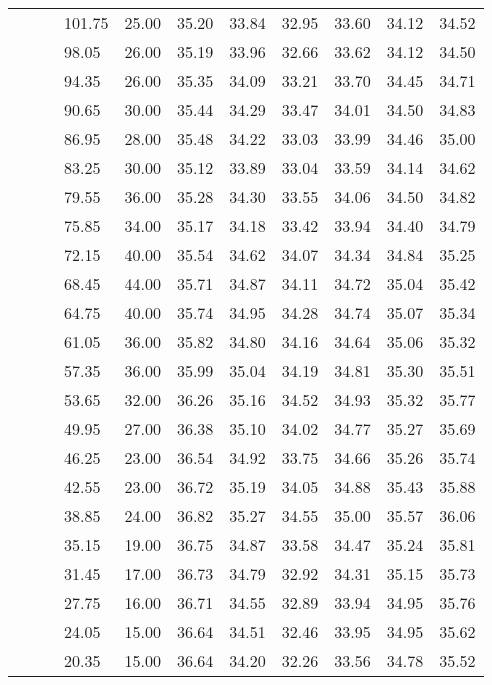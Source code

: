 \begin{longtable}{llllrrrrrrr}
   &  &  & 101.75 & 25.00 & 35.20 & 33.84 & 32.95 & 33.60 & 34.12 & 34.52 \\ 
   &  &  & 98.05 & 26.00 & 35.19 & 33.96 & 32.66 & 33.62 & 34.12 & 34.50 \\ 
   &  &  & 94.35 & 26.00 & 35.35 & 34.09 & 33.21 & 33.70 & 34.45 & 34.71 \\ 
   &  &  & 90.65 & 30.00 & 35.44 & 34.29 & 33.47 & 34.01 & 34.50 & 34.83 \\ 
   &  &  & 86.95 & 28.00 & 35.48 & 34.22 & 33.03 & 33.99 & 34.46 & 35.00 \\ 
   &  &  & 83.25 & 30.00 & 35.12 & 33.89 & 33.04 & 33.59 & 34.14 & 34.62 \\ 
   &  &  & 79.55 & 36.00 & 35.28 & 34.30 & 33.55 & 34.06 & 34.50 & 34.82 \\ 
   &  &  & 75.85 & 34.00 & 35.17 & 34.18 & 33.42 & 33.94 & 34.40 & 34.79 \\ 
   &  &  & 72.15 & 40.00 & 35.54 & 34.62 & 34.07 & 34.34 & 34.84 & 35.25 \\ 
   &  &  & 68.45 & 44.00 & 35.71 & 34.87 & 34.11 & 34.72 & 35.04 & 35.42 \\ 
   &  &  & 64.75 & 40.00 & 35.74 & 34.95 & 34.28 & 34.74 & 35.07 & 35.34 \\ 
   &  &  & 61.05 & 36.00 & 35.82 & 34.80 & 34.16 & 34.64 & 35.06 & 35.32 \\ 
   &  &  & 57.35 & 36.00 & 35.99 & 35.04 & 34.19 & 34.81 & 35.30 & 35.51 \\ 
   &  &  & 53.65 & 32.00 & 36.26 & 35.16 & 34.52 & 34.93 & 35.32 & 35.77 \\ 
   &  &  & 49.95 & 27.00 & 36.38 & 35.10 & 34.02 & 34.77 & 35.27 & 35.69 \\ 
   &  &  & 46.25 & 23.00 & 36.54 & 34.92 & 33.75 & 34.66 & 35.26 & 35.74 \\ 
   &  &  & 42.55 & 23.00 & 36.72 & 35.19 & 34.05 & 34.88 & 35.43 & 35.88 \\ 
   &  &  & 38.85 & 24.00 & 36.82 & 35.27 & 34.55 & 35.00 & 35.57 & 36.06 \\ 
   &  &  & 35.15 & 19.00 & 36.75 & 34.87 & 33.58 & 34.47 & 35.24 & 35.81 \\ 
   &  &  & 31.45 & 17.00 & 36.73 & 34.79 & 32.92 & 34.31 & 35.15 & 35.73 \\ 
   &  &  & 27.75 & 16.00 & 36.71 & 34.55 & 32.89 & 33.94 & 34.95 & 35.76 \\ 
   &  &  & 24.05 & 15.00 & 36.64 & 34.51 & 32.46 & 33.95 & 34.95 & 35.62 \\ 
   &  &  & 20.35 & 15.00 & 36.64 & 34.20 & 32.26 & 33.56 & 34.78 & 35.52 \\ 

\end{longtable}
